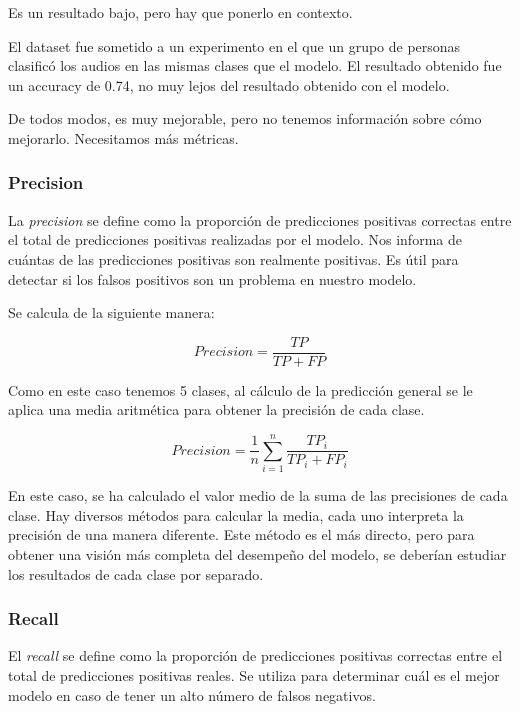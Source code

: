 Es un resultado bajo, pero hay que ponerlo en contexto.

El dataset fue sometido a un experimento en el que un grupo de personas clasificó los audios en las mismas clases que el modelo. \cite{AESDD_webpage}
El resultado obtenido fue un accuracy de 0.74, no muy lejos del resultado obtenido con el modelo.

De todos modos, es muy mejorable, pero no tenemos información sobre cómo mejorarlo.
Necesitamos más métricas.

\subsubsection{Precision}\label{seccion:precision}
La \textit{precision} se define como la proporción de predicciones positivas correctas entre el total de predicciones positivas realizadas por el modelo.
Nos informa de cuántas de las predicciones positivas son realmente positivas.
Es útil para detectar si los falsos positivos son un problema en nuestro modelo.

Se calcula de la siguiente manera:

\begin{equation}
    Precision = \frac{TP}{TP + FP}
\end{equation}

Como en este caso tenemos 5 clases, al cálculo de la predicción general se le aplica una media aritmética para obtener la precisión de cada clase.

\begin{equation}
    Precision = \frac{1}{n} \sum_{i=1}^{n} \frac{TP_i}{TP_i + FP_i}
\end{equation}

En este caso, se ha calculado el valor medio de la suma de las precisiones de cada clase.
Hay diversos métodos para calcular la media, cada uno interpreta la precisión de una manera diferente.
Este método es el más directo, pero para obtener una visión más completa del desempeño del modelo, se deberían estudiar los resultados de cada clase por separado.

\subsubsection{Recall}\label{seccion:recall}
El \textit{recall} se define como la proporción de predicciones positivas correctas entre el total de predicciones positivas reales.
Se utiliza para determinar cuál es el mejor modelo en caso de tener un alto número de falsos negativos.

